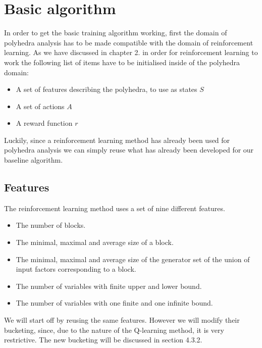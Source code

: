 \section{Basic algorithm}
In order to get the basic training algorithm working, first the domain of polyhedra analysis has to be made compatible with the domain of reinforcement learning. As we have discussed in chapter 2. in order for reinforcement learning to work the following list of items have to be initialised inside of the polyhedra domain:
\begin{itemize}
	\item A set of features describing the polyhedra, to use as states $S$
	\item A set of actions $A$
	\item A reward function $r$
\end{itemize}
Luckily, since a reinforcement learning method \cite{singh2018fast} has already been used for polyhedra analysis we can simply reuse what has already been developed for our baseline algorithm.\\
\subsection{Features}
The reinforcement learning method uses a set of nine different features.
\begin{itemize}
	\item The number of blocks.
	\item The minimal, maximal and average size of a block.
	\item The minimal, maximal and average size of the generator set of the union of input factors corresponding to a block.
	\item The number of variables with finite upper and lower bound.
	\item The number of variables with one finite and one infinite bound.
\end{itemize}
We will start off by reusing the same features. However we will modify their bucketing, since, due to the nature of the Q-learning method, it is very restrictive. The new bucketing will be discussed in section 4.3.2.


